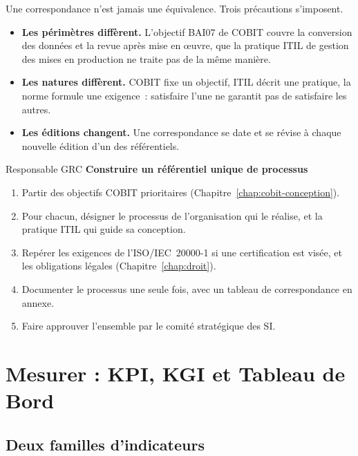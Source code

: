 Une correspondance n'est jamais une équivalence. Trois précautions
s'imposent.
\begin{itemize}
    \item \textbf{Les périmètres diffèrent.} L'objectif BAI07 de COBIT couvre
          la conversion des données et la revue après mise en œuvre, que la
          pratique ITIL de gestion des mises en production ne traite pas de
          la même manière.
    \item \textbf{Les natures diffèrent.} COBIT fixe un objectif, ITIL décrit
          une pratique, la norme formule une exigence~: satisfaire l'une ne
          garantit pas de satisfaire les autres.
    \item \textbf{Les éditions changent.} Une correspondance se date et se
          révise à chaque nouvelle édition d'un des référentiels.
\end{itemize}

\begin{boxmetier}{Responsable GRC}
\textbf{Construire un référentiel unique de processus}
\begin{enumerate}
    \item Partir des objectifs COBIT prioritaires
          (Chapitre~\ref{chap:cobit-conception}).
    \item Pour chacun, désigner le processus de l'organisation qui le
          réalise, et la pratique ITIL qui guide sa conception.
    \item Repérer les exigences de l'ISO/IEC~20000-1 si une certification
          est visée, et les obligations légales (Chapitre~\ref{chap:droit}).
    \item Documenter le processus une seule fois, avec un tableau de
          correspondance en annexe.
    \item Faire approuver l'ensemble par le comité stratégique des SI.
\end{enumerate}
\end{boxmetier}

\section{Mesurer : KPI, KGI et Tableau de Bord}
\label{sec:c16-mesure}

\subsection{Deux familles d'indicateurs}

